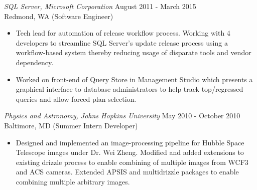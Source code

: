 \documentclass{res}
\begin{document}
\begin{resume}
{\sl SQL Server, Microsoft Corporation} \hfill        {\small August 2011 - March 2015} \\
{\small Redmond, WA       \hfill   (Software Engineer)}
   \begin{itemize} \itemsep -2pt %
   \item Tech lead for automation of release workflow process. Working with 4 developers to streamline SQL Server's
     update release process using a workflow-based system thereby reducing usage of disparate tools and vendor dependency.
   \item Worked on front-end of Query Store in Management Studio which presents a graphical
     interface to database administrators to help track top/regressed queries and allow forced plan selection.
 \end{itemize}
 
 
 
{\sl Physics and Astronomy, Johns Hopkins University} \hfill   {\small May 2010 - October 2010}\\
{\small Baltimore, MD       \hfill   (Summer Intern Developer)}
  \begin{itemize} \itemsep -2pt
  \item  Designed and implemented an image-processing pipeline for Hubble Space Telescope images under 
  Dr. Wei Zheng. Modified and added extensions to existing drizzle process to enable combining of multiple images from
  WCF3 and ACS cameras. Extended APSIS and multidrizzle packages to enable combining multiple arbitrary images.
\end{itemize} 


\end{resume}
\end{document}
